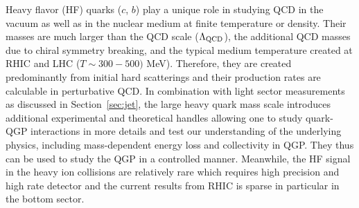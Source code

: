 Heavy flavor (HF) quarks ($c$, $b$) play a unique role in studying QCD in the vacuum as well as in the nuclear medium at finite temperature or density. Their masses are much larger than the QCD scale ($\Lambda_{\rm QCD}$), the additional QCD masses due to chiral symmetry breaking, and the typical medium temperature created at RHIC and LHC ($T \sim 300-500)$ MeV). Therefore, they are created predominantly from initial hard scatterings and their production rates are calculable in perturbative QCD. In combination with light sector measurements as discussed in Section~\ref{sec:jet}, the large heavy quark mass scale introduces additional experimental and theoretical handles allowing one to study quark-QGP interactions in more details and test our understanding of the underlying physics, including mass-dependent energy loss and collectivity in QGP. They thus can be used to study the QGP in a controlled manner. Meanwhile, the HF signal in the heavy ion collisions are relatively rare which requires high precision and high rate detector and the current results from RHIC is sparse in particular in the bottom sector. 


